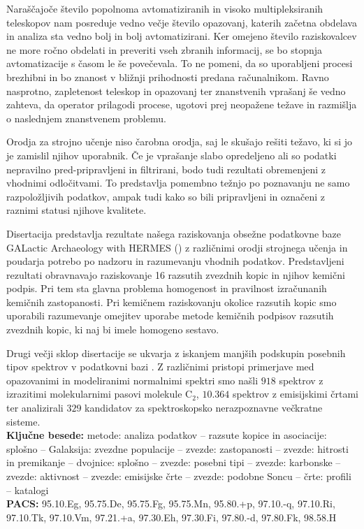 Naraščajoče število popolnoma avtomatiziranih in visoko multipleksiranih teleskopov nam posreduje vedno večje število opazovanj, katerih začetna obdelava in analiza sta vedno bolj in bolj avtomatizirani. Ker omejeno število raziskovalcev ne more ročno obdelati in preveriti vseh zbranih informacij, se bo stopnja avtomatizacije s časom le še povečevala. To ne pomeni, da so uporabljeni procesi brezhibni in bo znanost v bližnji prihodnosti predana računalnikom. Ravno nasprotno, zapletenost teleskop in opazovanj ter  znanstvenih vprašanj še vedno zahteva, da operator prilagodi procese, ugotovi prej neopažene težave in razmišlja o naslednjem znanstvenem problemu.

Orodja za strojno učenje niso čarobna orodja, saj le skušajo rešiti težavo, ki si jo je zamislil njihov uporabnik. Če je vprašanje slabo opredeljeno ali so podatki nepravilno pred-pripravljeni in filtrirani, bodo tudi rezultati obremenjeni z vhodnimi odločitvami. To predstavlja pomembno težnjo po poznavanju ne samo razpoložljivih podatkov, ampak tudi kako so bili pripravljeni in označeni z raznimi statusi njihove kvalitete.

Disertacija predstavlja rezultate našega raziskovanja obsežne podatkovne baze GALactic Archaeology with HERMES (\Gh) z različnimi orodji strojnega učenja in poudarja potrebo po nadzoru in razumevanju vhodnih podatkov. Predstavljeni rezultati obravnavajo raziskovanje 16 razsutih zvezdnih kopic in njihov kemični podpis. Pri tem sta glavna problema homogenost in pravilnost izračunanih kemičnih zastopanosti. Pri kemičnem raziskovanju okolice razsutih kopic smo uporabili razumevanje omejitev uporabe metode kemičnih podpisov razsutih zvezdnih kopic, ki naj bi imele homogeno sestavo.

Drugi večji sklop disertacije se ukvarja z iskanjem manjših podskupin posebnih tipov spektrov v podatkovni bazi \Gh. Z različnimi pristopi primerjave med opazovanimi in modeliranimi normalnimi spektri smo našli $918$ spektrov z izrazitimi molekularnimi pasovi molekule C$_2$, $10.364$ spektrov z emisijskimi črtami ter analizirali $329$ kandidatov za spektroskopsko nerazpoznavne večkratne sisteme.\\[10mm]
{\bf Ključne besede:} metode: analiza podatkov -- razsute kopice in asociacije: splošno -- Galaksija: zvezdne populacije -- zvezde: zastopanosti -- zvezde: hitrosti in premikanje -- dvojnice: splošno -- zvezde: posebni tipi -- zvezde: karbonske -- zvezde: aktivnost -- zvezde: emisijske črte -- zvezde: podobne Soncu -- črte: profili -- katalogi\\[3mm]
{\bf PACS:} 95.10.Eg, 95.75.De, 95.75.Fg, 95.75.Mn, 95.80.+p, 97.10.-q, 97.10.Ri, 97.10.Tk, 97.10.Vm, 97.21.+a, 97.30.Eh, 97.30.Fi, 97.80.-d, 97.80.Fk, 98.58.H